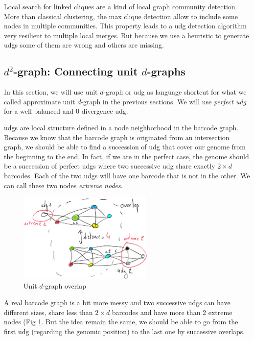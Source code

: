 Local search for linked cliques are a kind of local graph community detection.
More than classical clustering, the max clique detection allow to include some nodes in multiple communities.
This property leads to a udg detection algorithm very resilient to multiple local merges.
But because we use a heuristic to generate udgs some of them are wrong and others are missing.

\subsection{$d^{2}$-graph: Connecting unit $d$-graphs}

In this section, we will use unit $d$-graph or udg as language shortcut for what we called approximate unit $d$-graph in the previous sections.
We will use \textit{perfect udg} for a well balanced and 0 divergence udg.

udgs are local structure defined in a node neighborhood in the barcode graph.
Because we know that the barcode graph is originated from an intersection graph, we should be able to find a succession of udg that cover our genome from the beginning to the end.
In fact, if we are in the perfect case, the genome should be a succession of perfect udgs where two successive udg share exactly $2 \times d$ barcodes.
Each of the two udgs will have one barcode that is not in the other.
We can call these two nodes \textit{extreme nodes}.

\begin{figure}[htp]
    \centering
    \includegraphics[width=0.6\textwidth]{overlap.pdf}
    \caption{Unit $d$-graph overlap}
    \label{fig:overlap}
\end{figure}

A real barcode graph is a bit more messy and two successive udgs can have different sizes, share less than $2 \times d$ barcodes and have more than 2 extreme nodes (Fig \ref{fig:overlap}.
But the idea remain the same, we should be able to go from the first udg (regarding the genomic position) to the last one by successive overlaps.


